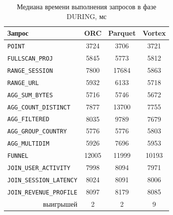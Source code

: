 \begin{table}
    \caption{Медиана времени выполнения запросов в фазе DURING, мс}
    \label{tab:read-during}
    \begin{tabularx}{\textwidth}{|X|c|c|c|}\hline
    \textbf{Запрос} & \textbf{ORC} & \textbf{Parquet} & \textbf{Vortex} \\ \hline
    \texttt{POINT}                  & 3724  & 3706  & 3721 \\ \hline
    \texttt{FULLSCAN\_PROJ}          & 5845  & 5773  & 5812 \\ \hline
    \texttt{RANGE\_SESSION}          & 7800  & 17684 & 5863 \\ \hline
    \texttt{RANGE\_URL}              & 5932  & 6133  & 5718 \\ \hline
    \texttt{AGG\_SUM\_BYTES}         & 5716  & 5746  & 5672 \\ \hline
    \texttt{AGG\_COUNT\_DISTINCT}    & 7877  & 13700 & 7755 \\ \hline
    \texttt{AGG\_FILTERED}           & 8035  & 9789  & 7679 \\ \hline
    \texttt{AGG\_GROUP\_COUNTRY}     & 5776  & 5776  & 5803 \\ \hline
    \texttt{AGG\_MULTIDIM}           & 5926  & 7696  & 5953 \\ \hline
    \texttt{FUNNEL}                  & 12005 & 11999 & 10193 \\ \hline
    \texttt{JOIN\_USER\_ACTIVITY}    & 7998  & 8094  & 7971 \\ \hline
    \texttt{JOIN\_SESSION\_LATENCY}  & 8024  & 8091  & 8006 \\ \hline
    \texttt{JOIN\_REVENUE\_PROFILE}  & 8097  & 8179  & 8085 \\ \hline
    \multicolumn{1}{|r|}{выигрышей} & 2 & 2 & 9 \\ \hline
    \end{tabularx}
\end{table}

